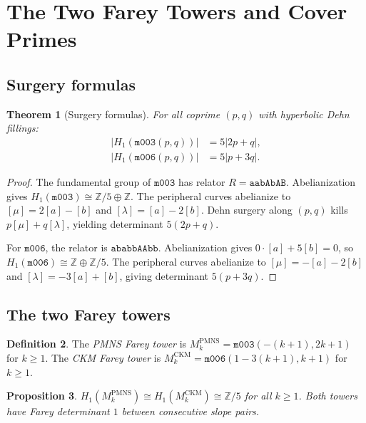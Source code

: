 \documentclass[11pt,a4paper]{article}
\newtheorem{theorem}{Theorem}[section]
\newtheorem{proposition}[theorem]{Proposition}
\theoremstyle{definition}
\newtheorem{definition}[theorem]{Definition}
\newcommand{\ZZ}{\mathbb{Z}}
\begin{document}
\section{The Two Farey Towers and Cover Primes}
\label{sec:setup}

\subsection{Surgery formulas}

\begin{theorem}[Surgery formulas]
\label{thm:surgery}
For all coprime $(p,q)$ with hyperbolic Dehn fillings:
\begin{align}
  |H_1(\texttt{m003}(p,q))| &= 5|2p+q|, \label{eq:surgery-pmns}\\
  |H_1(\texttt{m006}(p,q))| &= 5|p+3q|. \label{eq:surgery-ckm}
\end{align}
\end{theorem}

\begin{proof}
The fundamental group of $\texttt{m003}$ has relator $R = \texttt{aabAbAB}$.
Abelianization gives $H_1(\texttt{m003}) \cong \ZZ/5 \oplus \ZZ$.
The peripheral curves abelianize to $[\mu] = 2[a] - [b]$
and $[\lambda] = [a] - 2[b]$.
Dehn surgery along $(p,q)$ kills $p[\mu]+q[\lambda]$,
yielding determinant $5(2p+q)$.

For $\texttt{m006}$, the relator is $\texttt{ababbAAbb}$.
Abelianization gives $0 \cdot [a] + 5[b] = 0$,
so $H_1(\texttt{m006}) \cong \ZZ \oplus \ZZ/5$.
The peripheral curves abelianize to
$[\mu] = -[a]-2[b]$ and $[\lambda] = -3[a]+[b]$,
giving determinant $5(p+3q)$.
\end{proof}

\subsection{The two Farey towers}

\begin{definition}
The \emph{PMNS Farey tower} is
$M_k^{\mathrm{PMNS}} = \texttt{m003}(-(k+1), 2k+1)$ for $k \geq 1$.
The \emph{CKM Farey tower} is
$M_k^{\mathrm{CKM}} = \texttt{m006}(1-3(k+1), k+1)$ for $k \geq 1$.
\end{definition}

\begin{proposition}
\label{prop:h1}
$H_1(M_k^{\mathrm{PMNS}}) \cong H_1(M_k^{\mathrm{CKM}}) \cong \ZZ/5$
for all $k \geq 1$. Both towers have Farey determinant $1$
between consecutive slope pairs.
\end{proposition}
\end{document}
